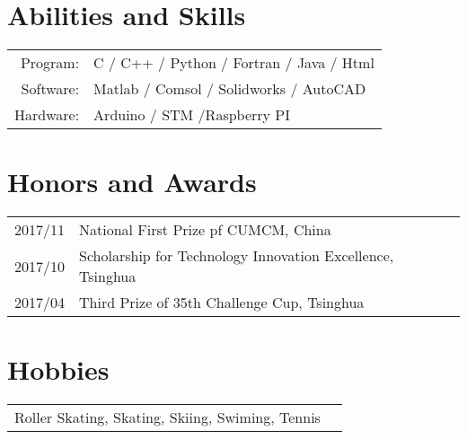 \documentclass[a4paper,10pt]{article}
\begin{document}
\section{Abilities and Skills}
\begin{tabular}{rl}
Program:  & C / C++ / Python / Fortran / Java / Html \\
Software: & Matlab / Comsol / Solidworks / AutoCAD   \\
Hardware: & Arduino / STM /Raspberry PI              \\
\end{tabular}

\section{Honors and Awards}
\begin{tabular}{rl}
\textsc{2017/11} & National First Prize pf CUMCM, China                       \\
\textsc{2017/10} & Scholarship for Technology Innovation Excellence, Tsinghua \\
\textsc{2017/04} & Third Prize of 35th Challenge Cup, Tsinghua                \\
\end{tabular}

\section{Hobbies}
\begin{tabular}{rl}
Roller Skating, Skating, Skiing, Swiming, Tennis
\end{tabular}
\end{document}

